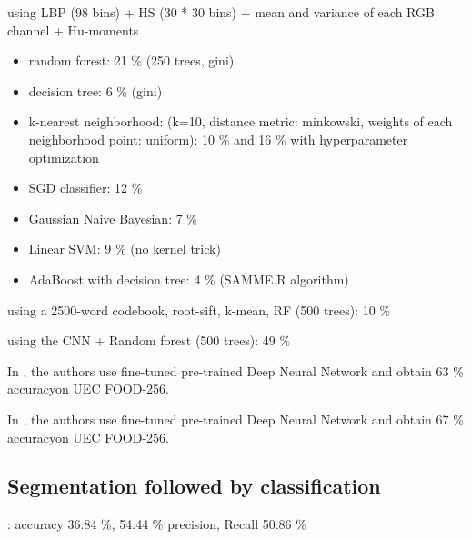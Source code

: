 using LBP (98 bins) + HS (30 * 30 bins) + mean and variance of each RGB channel + Hu-moments
\begin{itemize}
    \item random forest: 21 \% (250 trees, gini)
    \item decision tree: 6 \% (gini)
    \item k-nearest neighborhood: (k=10, distance metric: minkowski, weights of each neighborhood point: uniform): 10 \% and 16 \% with hyperparameter optimization
    \item SGD classifier:  12 \%
    \item Gaussian Naive Bayesian: 7 \%
    \item Linear SVM: 9 \% (no kernel trick)
    \item AdaBoost with decision tree: 4 \% (SAMME.R algorithm)
\end{itemize}

using a 2500-word codebook, root-sift, k-mean, RF (500 trees): 10 \% 

using the CNN + Random forest (500 trees): 49 \%

In \cite{Bolanos2016}, the authors use fine-tuned pre-trained Deep Neural Network and obtain 63 \% accuracyon UEC FOOD-256.

In \cite{Yanai2015}, the authors use fine-tuned pre-trained Deep Neural Network and obtain 67 \% accuracyon UEC FOOD-256.


\subsection{Segmentation followed by classification}

\cite{Bolanos2016} : accuracy 36.84 \%, 54.44 \% precision, Recall 50.86 \%

